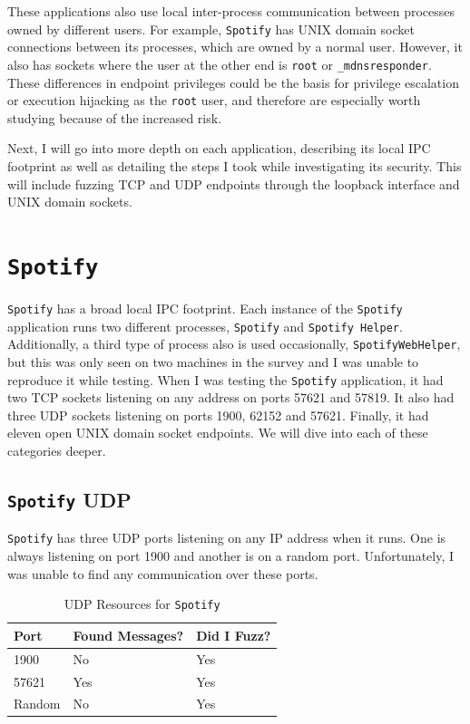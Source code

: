 These applications also use local inter-process communication between processes owned by different users.  For example, \texttt{Spotify} has UNIX domain socket connections between its processes, which are owned by a normal user.  However, it also has sockets where the user at the other end is \texttt{root} or \texttt{\_mdnsresponder}.  These differences in endpoint privileges could be the basis for privilege escalation or execution hijacking as the \texttt{root} user, and therefore are especially worth studying because of the increased risk.

Next, I will go into more depth on each application, describing its local IPC footprint as well as detailing the steps I took while investigating its security.  This will include fuzzing TCP and UDP endpoints through the loopback interface and UNIX domain sockets.

\section{\texttt{Spotify}}
\label{sec:spotify}
\texttt{Spotify} has a broad local IPC footprint.  Each instance of the \texttt{Spotify} application runs two different processes, \texttt{Spotify} and \texttt{Spotify Helper}.  Additionally, a third type of process also is used occasionally, \texttt{SpotifyWebHelper}, but this was only seen on two machines in the survey and I was unable to reproduce it while testing.  When I was testing the \texttt{Spotify} application, it had two TCP sockets listening on any address on ports 57621 and 57819.  It also had three UDP sockets listening on ports 1900, 62152 and 57621.  Finally, it had eleven open UNIX domain socket endpoints.  We will dive into each of these categories deeper.

\subsection{\texttt{Spotify} UDP}
\label{sec:spotifyUdp}
\texttt{Spotify} has three UDP ports listening on any IP address when it runs.  One is always listening on port 1900 and another is on a random port.  Unfortunately, I was unable to find any communication over these ports.

\begin{table}
\centering
\begin{normalsize}
\begin{tabular}{ l | l | l }
\textbf{Port} & \textbf{Found Messages?} & \textbf{Did I Fuzz?} \\ \hline
1900 & No & Yes \\ \hline
57621 & Yes & Yes \\ \hline
Random & No & Yes \\ \hline
\end{tabular}
\caption{UDP Resources for \texttt{Spotify}}
\label{tab:spotifyUdp}
\end{normalsize}
\end{table} 


